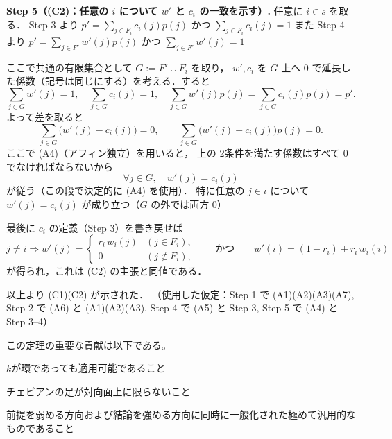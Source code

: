 \documentclass[a4paper,12pt]{bxjsbook}
\makeatletter
\newlength{\customindent}
\newenvironment{body}{
  \par
  \begingroup
  \setlength{\leftskip}{\customindent}
  \setlength{\rightskip}{0pt}
  \setlength{\parindent}{1em}
  \setlength{\displayindent}{\customindent}
  \setlength{\displaywidth}{\dimexpr\linewidth-\customindent\relax}
}{
  \par
  \endgroup
}
\theoremstyle{theorem}
\renewenvironment{proof}[1][\proofname]{%
  \par\pushQED{\qed}%
  \normalfont
  \topsep6\p@\@plus6\p@\relax
  \list{}{%
    \leftmargin=\customindent
    \rightmargin=0pt
    \labelwidth=0pt
    \labelsep=0pt
    \itemindent=0pt
    \listparindent=0pt
    \parsep=0pt
  }%
  \item[\itshape #1\@addpunct{.}\hspace{0.5em}]%
  \setlength{\displayindent}{\customindent}%
  \setlength{\displaywidth}{\dimexpr\linewidth-\customindent\relax}%
  \ignorespaces
}{%
  \popQED\endlist\@endpefalse
}
\makeatother
\begin{document}
\begin{proof}
        \medskip
        \noindent\textbf{Step 5（(C2)：任意の $i$ について $w'$ と $c_i$ の一致を示す）.}
        任意に $i\in s$ を取る．
        Step 3 より $p'=\sum_{j\in F_i}c_i(j)p(j)$ かつ $\sum_{j\in F_i}c_i(j)=1$
        また Step 4 より $p'=\sum_{j\in F'}w'(j)p(j)$ かつ $\sum_{j\in F'}w'(j)=1$
  
        ここで共通の有限集合として $G:=F'\cup F_i$ を取り，
        $w',c_i$ を $G$ 上へ 0 で延長した係数（記号は同じにする）を考える．すると
        \[
        \sum_{j\in G}w'(j)=1,\quad \sum_{j\in G}c_i(j)=1,\quad
        \sum_{j\in G}w'(j)p(j)=\sum_{j\in G}c_i(j)p(j)=p'.
        \]
        よって差を取ると
        \[
        \sum_{j\in G}\bigl(w'(j)-c_i(j)\bigr)=0,\qquad
        \sum_{j\in G}\bigl(w'(j)-c_i(j)\bigr)p(j)=0.
        \]
        ここで (A4)（アフィン独立）を用いると，
        上の 2条件を満たす係数はすべて 0 でなければならないから
        \[
        \forall j\in G,\quad w'(j)=c_i(j)
        \]
        が従う（この段で決定的に (A4) を使用）．
        特に任意の $j\in\iota$ について $w'(j)=c_i(j)$ が成り立つ（$G$ の外では両方 0）
  
        最後に $c_i$ の定義（Step 3）を書き戻せば
        \[
        j\neq i \Rightarrow
        w'(j)=
        \begin{cases}
            r_i\,w_i(j) & (j\in F_i),\\
            0 & (j\notin F_i),
        \end{cases}
        \qquad\text{かつ}\qquad
        w'(i)=(1-r_i)+r_i\,w_i(i)
        \]
        が得られ，これは (C2) の主張と同値である．
  
        \medskip
        以上より (C1)(C2) が示された．
        （使用した仮定：Step 1 で (A1)(A2)(A3)(A7),
        Step 2 で (A6) と (A1)(A2)(A3),
        Step 4 で (A5) と Step 3,
        Step 5 で (A4) と Step 3--4）
    \end{proof}

    \begin{body}
        \indent この定理の重要な貢献は以下である。
        \begin{bodyitemize}
            \item $k$が環であっても適用可能であること
            \item チェビアンの足が対向面上に限らないこと
            \item 前提を弱める方向および結論を強める方向に同時に一般化された極めて汎用的なものであること
        \end{bodyitemize}
    \end{body}
\end{document}
